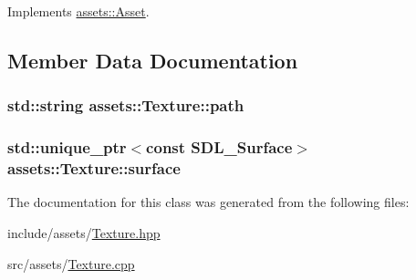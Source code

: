 Implements \hyperlink{classassets_1_1Asset_a43d029b59109ff2952206969d503c25f}{assets\-::\-Asset}.



\subsection{Member Data Documentation}
\hypertarget{classassets_1_1Texture_a22a5889e7d6fffc92301820fe561f8dc}{
\subsubsection[{path}]{\setlength{\rightskip}{0pt plus 5cm}std\-::string assets\-::\-Texture\-::path}}\label{classassets_1_1Texture_a22a5889e7d6fffc92301820fe561f8dc}
\hypertarget{classassets_1_1Texture_a88e1832541508cabf5e3856fa23a0b5d}{
\subsubsection[{surface}]{\setlength{\rightskip}{0pt plus 5cm}std\-::unique\-\_\-ptr$<$const S\-D\-L\-\_\-\-Surface$>$ assets\-::\-Texture\-::surface}}\label{classassets_1_1Texture_a88e1832541508cabf5e3856fa23a0b5d}


The documentation for this class was generated from the following files\-:\begin{DoxyCompactItemize}
\item 
include/assets/\hyperlink{Texture_8hpp}{Texture.\-hpp}\item 
src/assets/\hyperlink{Texture_8cpp}{Texture.\-cpp}\end{DoxyCompactItemize}
